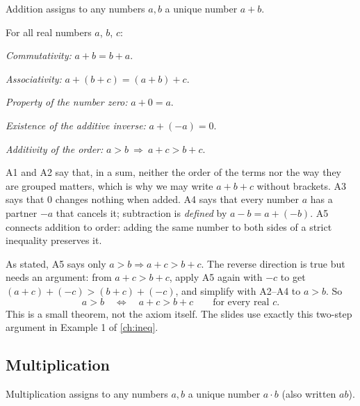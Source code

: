 Addition assigns to any numbers $a,b$ a unique number $a+b$.

\begin{definition}
For all real numbers $a$, $b$, $c$:
\begin{description}[style=sameline, leftmargin=3.2em, font=\sffamily\bfseries\color{defcol}]
  \item[A1] \emph{Commutativity:} $a+b=b+a$.
  \item[A2] \emph{Associativity:} $a+(b+c)=(a+b)+c$.
  \item[A3] \emph{Property of the number zero:} $a+0=a$.
  \item[A4] \emph{Existence of the additive inverse:} $a+(-a)=0$.
  \item[A5] \emph{Additivity of the order:} $a>b\ \Rightarrow\ a+c>b+c$.
\end{description}
\end{definition}

A1 and A2 say that, in a sum, neither the order of the terms nor the way they are grouped matters, which is
why we may write $a+b+c$ without brackets. A3 says that $0$ changes nothing when added. A4 says that every
number $a$ has a partner $-a$ that cancels it; subtraction is \emph{defined} by $a-b=a+(-b)$. A5 connects
addition to order: adding the same number to both sides of a strict inequality preserves it.

\begin{warning}
As stated, A5 says only $a>b\Rightarrow a+c>b+c$. The reverse direction is true but needs an argument: from
$a+c>b+c$, apply A5 again with $-c$ to get $(a+c)+(-c)>(b+c)+(-c)$, and simplify with A2--A4 to $a>b$. So
\[
a>b\quad\Longleftrightarrow\quad a+c>b+c \qquad\text{for every real } c.
\]
This is a small theorem, not the axiom itself. The slides use exactly this two-step argument in Example 1 of
\cref{ch:ineq}.
\end{warning}

\subsection{Multiplication}

Multiplication assigns to any numbers $a,b$ a unique number $a\cdot b$ (also written $ab$).

